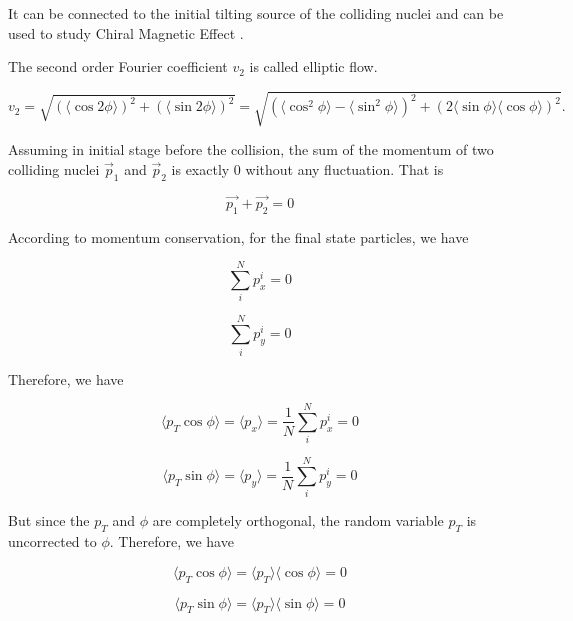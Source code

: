 It can be connected to the initial tilting source of the colliding nuclei \cite{V1Tilted} and can be used to study Chiral Magnetic Effect \cite{V1CME}. 

The second order Fourier coefficient $v_2$ is called elliptic flow. 

\begin{equation}
v_2 =  \sqrt{(\langle \cos 2\phi \rangle)^2+(\langle \sin 2\phi \rangle)^2} =  \sqrt{(\langle \cos^2 \phi \rangle - \langle \sin^2 \phi \rangle)^2 + (2  \langle \sin \phi \rangle \langle \cos \phi \rangle)^2}. 
\end{equation}

Assuming in initial stage before the collision, the sum of the momentum of two colliding nuclei $\vec p_1$ and $\vec p_2$ is exactly 0 without any fluctuation. That is

\begin{equation}
\vec{p_1} + \vec{p_2} = 0
\end{equation}

According to momentum conservation, for the final state particles, we have 

\begin{equation}
\sum_i^N p_x^i = 0
\end{equation}

\begin{equation}
\sum_i^N p_y^i = 0
\end{equation}

Therefore, we have

\begin{equation}
\langle p_T \cos \phi \rangle = \langle p_x \rangle = \frac{1}{N} \sum_i^N p_x^i   = 0
\end{equation}

\begin{equation}
\langle p_T \sin \phi \rangle = \langle p_y \rangle =  \frac{1}{N} \sum_i^N p_y^i  = 0
\end{equation}
 
But since the $p_T$ and $\phi$ are completely orthogonal, the random variable $p_T$ is uncorrected to $\phi$. Therefore, we have 
 
\begin{equation}
\langle p_T \cos \phi \rangle =  \langle p_T \rangle \langle  \cos \phi \rangle = 0
\end{equation}

\begin{equation}
\langle p_T \sin \phi \rangle =  \langle p_T \rangle \langle  \sin \phi \rangle = 0
\end{equation}

